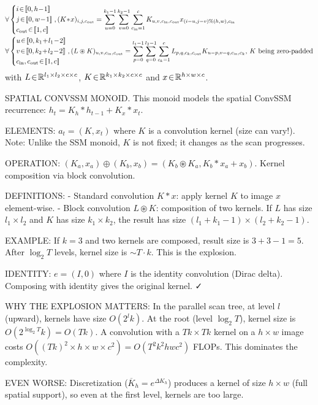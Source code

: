 \documentclass{article}
\begin{document}
\begin{align*}
    & \forall \left\{
\begin{aligned}
    &i\!\in\!\intint{0}{h\!-\!1}\\
    &j\!\in\!\intint{0}{w\!-\!1}\\
    &c_{\mathrm{out}}\!\in\!\intint{1}{c}
\end{aligned}
\right., (K\!\ast\!x)_{i,j,c_{\mathrm{out}}} = \sum_{u=0}^{k_1-1}\sum_{v=0}^{k_2-1}\sum_{c_{\mathrm{in}}=1}^{c} K_{u,v,c_{\mathrm{in}},c_{\mathrm{out}}} x_{(i-u,j-v)\%(h,w),c_{\mathrm{in}}}\\
    & \forall \left\{
\begin{aligned}
    &u\!\in\!\intint{0}{k_1\!+\!l_1\!-\!2}\\
    &v\!\in\!\intint{0}{k_2\!+\!l_2\!-\!2}\\
    &c_{\mathrm{in}},c_{\mathrm{out}}\!\in\!\intint{1}{c}
\end{aligned}
\right., (L \circledast K)_{u,v,c_{\mathrm{in}},c_{\mathrm{out}}} = \sum_{p=0}^{l_1-1}\sum_{q=0}^{l_2-1}\sum_{c_{k}=1}^{c} L_{p,q,c_{k},c_{\mathrm{out}}} K_{u-p,v-q,c_{\mathrm{in}},c_{k}}\text{, $K$ being zero-padded}
\end{align*}
\noindent with $L\!\in\!\mathbb{R}^{l_1\times l_2\times c \times c}$, $K\!\in\!\mathbb{R}^{k_1\times k_2\times c \times c}$ and $x\!\in\!\mathbb{R}^{h \times w \times c}$.

\begin{thomasbox}
SPATIAL CONVSSM MONOID. This monoid models the spatial ConvSSM recurrence: $h_t = K_h \ast h_{t-1} + K_x \ast x_t$.

ELEMENTS: $a_t = (K, x_t)$ where $K$ is a convolution kernel (size can vary!). Note: Unlike the SSM monoid, $K$ is not fixed; it changes as the scan progresses.

OPERATION: $(K_a, x_a) \oplus (K_b, x_b) = (K_b \circledast K_a, K_b \ast x_a + x_b)$. Kernel composition via block convolution.

DEFINITIONS:
- Standard convolution $K \ast x$: apply kernel $K$ to image $x$ element-wise.
- Block convolution $L \circledast K$: composition of two kernels. If $L$ has size $l_1 \times l_2$ and $K$ has size $k_1 \times k_2$, the result has size $(l_1 + k_1 - 1) \times (l_2 + k_2 - 1)$.

EXAMPLE: If $k=3$ and two kernels are composed, result size is $3 + 3 - 1 = 5$. After $\log_2 T$ levels, kernel size is $\sim T \cdot k$. This is the explosion.

IDENTITY: $e = (I, 0)$ where $I$ is the identity convolution (Dirac delta). Composing with identity gives the original kernel. ✓

WHY THE EXPLOSION MATTERS: In the parallel scan tree, at level $l$ (upward), kernels have size $O(2^l k)$. At the root (level $\log_2 T$), kernel size is $O(2^{\log_2 T} k) = O(Tk)$. A convolution with a $Tk \times Tk$ kernel on a $h \times w$ image costs $O((Tk)^2 \times h \times w \times c^2) = O(T^2 k^2 hwc^2)$ FLOPs. This dominates the complexity.

EVEN WORSE: Discretization ($\overline{K}_h = e^{\Delta K_h}$) produces a kernel of size $h \times w$ (full spatial support), so even at the first level, kernels are too large.
\end{thomasbox}
\end{document}
